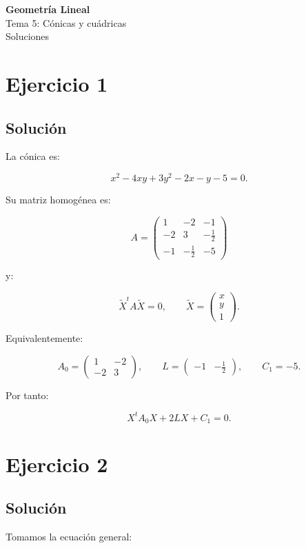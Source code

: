 \documentclass[11pt,a4paper]{article}
\begin{document}
\begin{center}
{\LARGE\bfseries Geometría Lineal}\\[0.4em]
{\Large Tema 5: Cónicas y cuádricas}\\[0.4em]
{\large Soluciones}
\end{center}

\section{Ejercicio 1}
\subsection{Solución}

La cónica es:

\[
x^2-4xy+3y^2-2x-y-5=0.
\]

Su matriz homogénea es:

\[
\boxed{
A=
\begin{pmatrix}
1&-2&-1\\
-2&3&-\frac12\\
-1&-\frac12&-5
\end{pmatrix}
}
\]

y:

\[
\boxed{
\widetilde X^tA\widetilde X=0,
\qquad
\widetilde X=
\begin{pmatrix}
x\\y\\1
\end{pmatrix}.
}
\]

Equivalentemente:

\[
A_0=
\begin{pmatrix}
1&-2\\
-2&3
\end{pmatrix},
\qquad
L=
\begin{pmatrix}
-1&-\frac12
\end{pmatrix},
\qquad
C_1=-5.
\]

Por tanto:

\[
\boxed{
X^tA_0X+2LX+C_1=0.
}
\]

\section{Ejercicio 2}
\subsection{Solución}

Tomamos la ecuación general:
\end{document}
